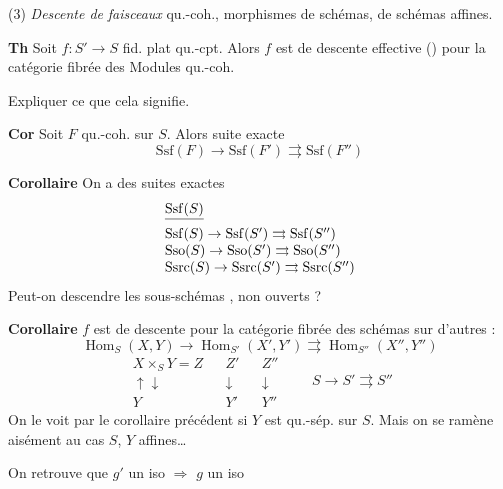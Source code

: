 \documentclass[11pt,a4paper]{article}
\begin{document}
(3) \emph{Descente de} \struck{\ill{}} \emph{faisceaux} \struck{\ill{}}  qu.-coh.,   morphismes de schémas, de schémas affines.


\textbf{Th} Soit $f : S' \to S$ fid. plat qu.-cpt. Alors $f$ est de descente effective () pour la catégorie fibrée des Modules qu.-coh.

Expliquer ce que cela signifie.

\textbf{Cor} \struck{\ill{}} Soit $F$ qu.-coh. sur $S$. Alors suite exacte
\[
\mathrm{Ssf}(F) \to \mathrm{Ssf}(F') \rightrightarrows \mathrm{Ssf}(F'')
\]

\textbf{Corollaire} On a des suites exactes
\[
\begin{array}{l}
\struck{\mathrm{Ssf}(S)} \\
\mathrm{Ssf}(S) \to \mathrm{Ssf}(S') \rightrightarrows \mathrm{Ssf}(S'') \\
\mathrm{Sso}(S) \to \mathrm{Sso}(S') \rightrightarrows \mathrm{Sso}(S'') \\
\mathrm{Ssrc}(S) \to \mathrm{Ssrc}(S') \rightrightarrows \mathrm{Ssrc}(S'')
\end{array}
\]
Peut-on descendre les sous-schémas , non ouverts ?

\textbf{Corollaire} $f$ est de descente  pour la catégorie fibrée des schémas sur d'autres :
\[
\operatorname{Hom}_S(X, Y) \to \operatorname{Hom}_{S'}(X', Y') \rightrightarrows \operatorname{Hom}_{S''}(X'', Y'')
\]
\[
\begin{array}{ccccc}
X \times_S Y = Z & & Z' & & Z'' \\
\uparrow\downarrow & & \downarrow & & \downarrow \\
Y & & Y' & & Y''
\end{array}
\qquad S \to S' \rightrightarrows S''
\]
On le voit par le corollaire précédent si $Y$ est qu.-sép. sur $S$. Mais on se ramène aisément au cas $S$, $Y$ affines…

On retrouve que $g'$ un iso $\Rightarrow$ $g$ un iso
\end{document}
